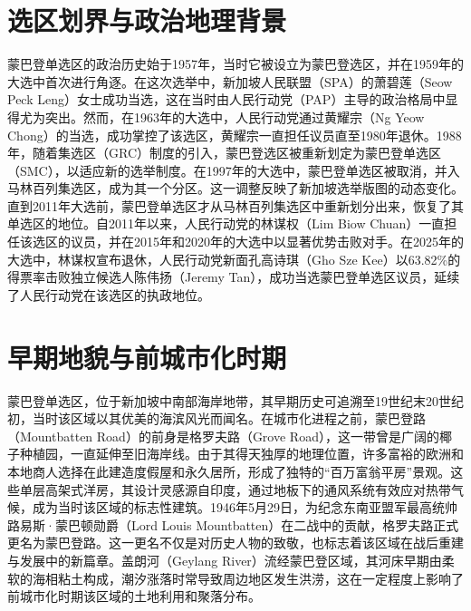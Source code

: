 \documentclass[11pt,a4paper,twoside,openany]{book}
\begin{document}
\section{选区划界与政治地理背景}
蒙巴登单选区的政治历史始于1957年，当时它被设立为蒙巴登选区，并在1959年的大选中首次进行角逐。在这次选举中，新加坡人民联盟（SPA）的萧碧莲（Seow Peck Leng）女士成功当选，这在当时由人民行动党（PAP）主导的政治格局中显得尤为突出。然而，在1963年的大选中，人民行动党通过黄耀宗（Ng Yeow Chong）的当选，成功掌控了该选区，黄耀宗一直担任议员直至1980年退休。1988年，随着集选区（GRC）制度的引入，蒙巴登选区被重新划定为蒙巴登单选区（SMC），以适应新的选举制度。在1997年的大选中，蒙巴登单选区被取消，并入马林百列集选区，成为其一个分区。这一调整反映了新加坡选举版图的动态变化。直到2011年大选前，蒙巴登单选区才从马林百列集选区中重新划分出来，恢复了其单选区的地位。自2011年以来，人民行动党的林谋权（Lim Biow Chuan）一直担任该选区的议员，并在2015年和2020年的大选中以显著优势击败对手。在2025年的大选中，林谋权宣布退休，人民行动党新面孔高诗琪（Gho Sze Kee）以63.82\%的得票率击败独立候选人陈伟扬（Jeremy Tan），成功当选蒙巴登单选区议员，延续了人民行动党在该选区的执政地位。

\section{早期地貌与前城市化时期}
蒙巴登单选区，位于新加坡中南部海岸地带，其早期历史可追溯至19世纪末20世纪初，当时该区域以其优美的海滨风光而闻名。在城市化进程之前，蒙巴登路（Mountbatten Road）的前身是格罗夫路（Grove Road），这一带曾是广阔的椰子种植园，一直延伸至旧海岸线。由于其得天独厚的地理位置，许多富裕的欧洲和本地商人选择在此建造度假屋和永久居所，形成了独特的“百万富翁平房”景观。这些单层高架式洋房，其设计灵感源自印度，通过地板下的通风系统有效应对热带气候，成为当时该区域的标志性建筑。1946年5月29日，为纪念东南亚盟军最高统帅路易斯·蒙巴顿勋爵（Lord Louis Mountbatten）在二战中的贡献，格罗夫路正式更名为蒙巴登路。这一更名不仅是对历史人物的致敬，也标志着该区域在战后重建与发展中的新篇章。盖朗河（Geylang River）流经蒙巴登区域，其河床早期由柔软的海相粘土构成，潮汐涨落时常导致周边地区发生洪涝，这在一定程度上影响了前城市化时期该区域的土地利用和聚落分布。
\end{document}
